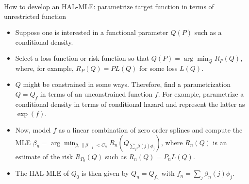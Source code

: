 \documentclass[t]{beamer}
\newlength{\wideitemsep}
\let\olditem\item
\renewcommand{\item}{\setlength{\itemsep}{\wideitemsep}\olditem}
\newcommand{\pl}{\parallel}
\begin{document}
\begin{frame}{How to develop an HAL-MLE: parametrize target function in terms of unrestricted function}
\begin{itemize}
\item Suppose one is interested in a functional parameter $Q(P)$  such as a conditional density.
\item Select a loss function or risk function so that $Q(P)=\arg\min_Q R_P(Q)$, where, for example, $R_P(Q)=PL(Q)$ for some loss $L(Q)$.
\item $Q$ might be constrained in some ways. Therefore, find a parametrization $Q=Q_f$ in terms of an unconstrained function $f$. For example, parametrize a conditional density in terms of conditional hazard and represent the latter as $\exp(f)$.
\item Now, model $f$ as a linear combination of zero order splines and compute the MLE
$\beta_n=\arg\min_{\beta,\pl\beta\pl_1<C_n}R_n\left (Q_{\sum_j \beta(j)\phi_j}\right)$,
where $R_n(Q)$ is an estimate of the risk $R_{P_0}(Q)$ such as $R_n(Q)=P_n L(Q)$.
\item The HAL-MLE of $Q_0$ is then given by $Q_n=Q_{f_n}$ with $f_n=\sum_j\beta_n(j)\phi_j$.
\end{itemize}
\end{frame}
\end{document}

